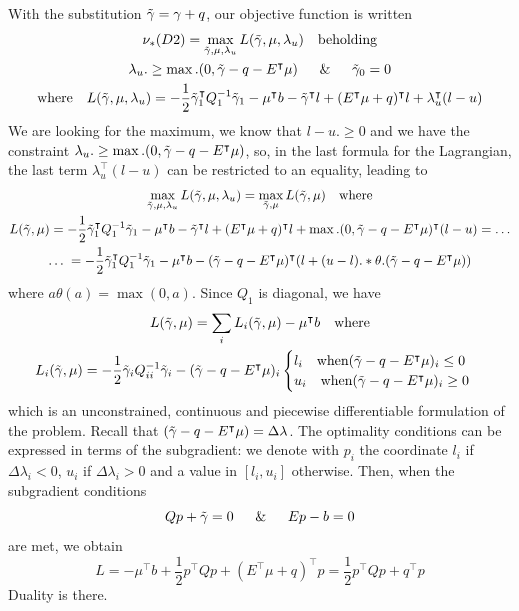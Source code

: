 \documentclass[10pt,twoside,book,a5paper]{ncc}
\begin{document}
With the substitution $\Tilde{\gamma} = \gamma + q$, our objective function is written
    \begin{gather*}
    \nu_*(D2) = \max_{\Tilde{\gamma}, \mu, \lambda_u} L(\Tilde{\gamma}, \mu, \lambda_u) \quad \textrm{beholding} \\
    \lambda_u .\ge \max.(0, \Tilde{\gamma} - q - E^\intercal\mu) \quad \And \quad \Tilde{\gamma}_0 = 0    \\
    \textrm{where} \quad L(\Tilde{\gamma}, \mu, \lambda_u) = -\frac{1}{2} \Tilde{\gamma}_1^\intercal Q_1^{-1}\Tilde{\gamma}_1 - \mu^\intercal b - \Tilde{\gamma}^\intercal l + (E^\intercal\mu + q)^\intercal l + \lambda_u^\intercal(l-u)
    \end{gather*}
We are looking for the maximum, we know that $l-u .\ge 0$ and we have the constraint $\lambda_u .\ge \max.(0, \Tilde{\gamma} - q - E^\intercal\mu)$, so, in the last formula for the Lagrangian, the last term $\lambda_u^\intercal(l-u)$ can be restricted to an equality, leading to
\begin{gather*}
    \max_{\Tilde{\gamma}, \mu, \lambda_u} L(\Tilde{\gamma}, \mu, \lambda_u) = \max_{\Tilde{\gamma}, \mu} L(\tilde{\gamma}, \mu)  \quad \textrm{where} \\
    L(\tilde{\gamma}, \mu) = -\frac{1}{2} \Tilde{\gamma}_1^\intercal Q_1^{-1}\Tilde{\gamma}_1 - \mu^\intercal b - \Tilde{\gamma}^\intercal l + (E^\intercal\mu + q)^\intercal l + \max.(0, \Tilde{\gamma} - q - E^\intercal\mu)^\intercal(l-u) = \dots \\
    \dots \; = -\frac{1}{2} \Tilde{\gamma}_1^\intercal Q_1^{-1}\Tilde{\gamma}_1 - \mu^\intercal b -  (\Tilde{\gamma} - q - E^\intercal\mu)^\intercal(l + (u-l) .* \theta.(\Tilde{\gamma} - q - E^\intercal\mu))
\end{gather*}
where $a\theta(a) = \max(0, a)$. Since $Q_1$ is diagonal, we have
\begin{gather*}
    L(\tilde{\gamma}, \mu) = \sum_i L_i (\tilde{\gamma}, \mu) - \mu^\intercal b \quad \textrm{where} \\
    L_i (\tilde{\gamma}, \mu) = -\frac{1}{2} \Tilde{\gamma}_i Q_{ii}^{-1}\Tilde{\gamma}_i - (\Tilde{\gamma} - q - E^\intercal\mu)_i \begin{cases}
             l_i \quad \textrm{when} (\Tilde{\gamma} - q - E^\intercal\mu)_i \le 0 \\
             u_i \quad \textrm{when} (\Tilde{\gamma} - q - E^\intercal\mu)_i \ge 0
        \end{cases}
\end{gather*}
which is an unconstrained, continuous and piecewise differentiable formulation of the problem. Recall that $(\Tilde{\gamma} - q - E^\intercal\mu) = \Delta \lambda$.
The optimality conditions can be expressed in terms of the subgradient: we denote with $p_i$ the coordinate $l_i$ if $\Delta\lambda_i < 0$, $u_i$ if $\Delta\lambda_i > 0$ and a value in $[l_i, u_i]$ otherwise. Then, when the subgradient conditions
\[
    Q p + \Tilde{\gamma} = 0 \quad \And \quad E p - b = 0
\]
are met, we obtain
\[
L = -\mu^\intercal b + \frac{1}{2}p^\intercal Q p + (E^\intercal\mu + q)^\intercal p = \frac{1}{2}p^\intercal Q p + q^\intercal p
\]
Duality is there.
\end{document}
